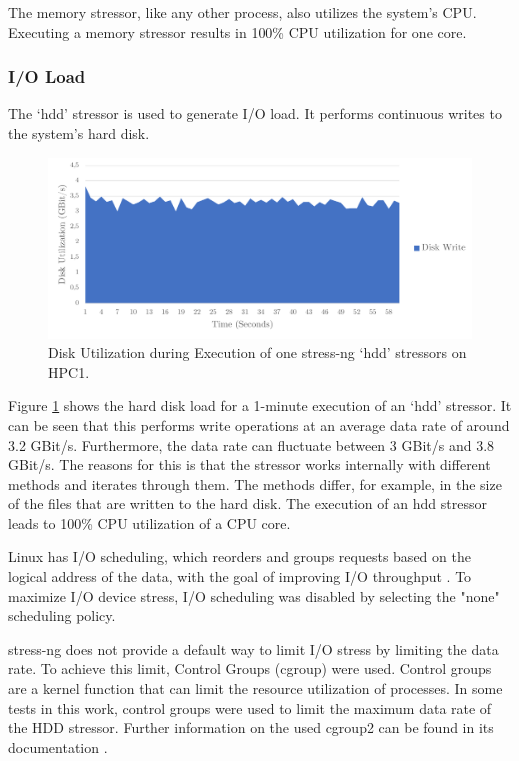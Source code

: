 The memory stressor, like any other process, also utilizes the system's CPU. Executing a memory stressor results in 100\% CPU utilization for one core.

\subsubsection{I/O Load} \label{chap:stressngIO}
The `hdd' stressor is used to generate I/O load. It performs continuous writes to the system's hard disk.

\begin{figure}[h!]
    \centering
    \includegraphics[width=1\linewidth]{figures/method/stress4.pdf}
    \caption{Disk Utilization during Execution of one stress-ng `hdd' stressors on HPC1.}
    \label{fig:stressIO}
\end{figure}

Figure \ref{fig:stressIO} shows the hard disk load for a 1-minute execution of an `hdd' stressor. It can be seen that this performs write operations at an average data rate of around 3.2 GBit/s. Furthermore, the data rate can fluctuate between 3 GBit/s and 3.8 GBit/s. The reasons for this is that the stressor works internally with different methods and iterates through them. The methods differ, for example, in the size of the files that are written to the hard disk. The execution of an hdd stressor leads to 100\% CPU utilization of a CPU core.

Linux has I/O scheduling, which reorders and groups requests based on the logical address of the data, with the goal of improving I/O throughput \cite{stress10}. To maximize I/O device stress, I/O scheduling was disabled by selecting the "none" scheduling policy.

stress-ng does not provide a default way to limit I/O stress by limiting the data rate. To achieve this limit, Control Groups (cgroup) were used. Control groups are a kernel function that can limit the resource utilization of processes. In some tests in this work, control groups were used to limit the maximum data rate of the HDD stressor. Further information on the used cgroup2 can be found in its documentation \cite{stress11}.

